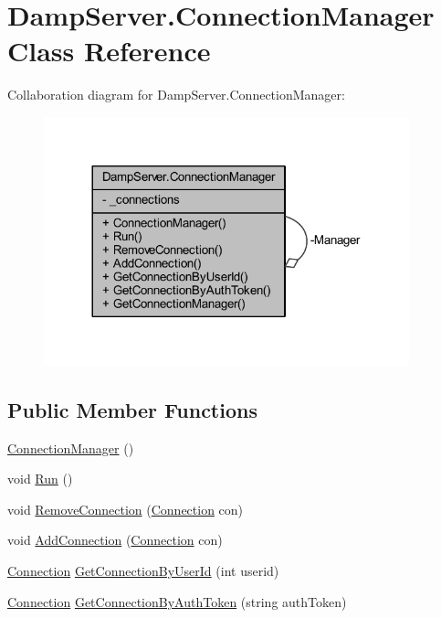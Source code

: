 \hypertarget{class_damp_server_1_1_connection_manager}{\section{Damp\-Server.\-Connection\-Manager Class Reference}
\label{class_damp_server_1_1_connection_manager}
}


Collaboration diagram for Damp\-Server.\-Connection\-Manager\-:
\nopagebreak
\begin{figure}[H]
\begin{center}
\leavevmode
\includegraphics[width=300pt]{class_damp_server_1_1_connection_manager__coll__graph}
\end{center}
\end{figure}
\subsection*{Public Member Functions}
\begin{DoxyCompactItemize}
\item 
\hyperlink{class_damp_server_1_1_connection_manager_a47a5d6c7569388fb281b12d83370bbbd}{Connection\-Manager} ()
\item 
void \hyperlink{class_damp_server_1_1_connection_manager_a1eb90220b3c9c05db5aa960c5d91c23b}{Run} ()
\item 
void \hyperlink{class_damp_server_1_1_connection_manager_a8e5ee00184d575d1968d9e0e7dcd72cc}{Remove\-Connection} (\hyperlink{class_damp_server_1_1_connection}{Connection} con)
\item 
void \hyperlink{class_damp_server_1_1_connection_manager_a34518ddc1dbe52c9d7df0379ee59d478}{Add\-Connection} (\hyperlink{class_damp_server_1_1_connection}{Connection} con)
\item 
\hyperlink{class_damp_server_1_1_connection}{Connection} \hyperlink{class_damp_server_1_1_connection_manager_af7150629327d57e7873291bca69b651b}{Get\-Connection\-By\-User\-Id} (int userid)
\item 
\hyperlink{class_damp_server_1_1_connection}{Connection} \hyperlink{class_damp_server_1_1_connection_manager_acc4c53acd75bbc7e52c42d5c8438a96b}{Get\-Connection\-By\-Auth\-Token} (string auth\-Token)
\end{DoxyCompactItemize}
